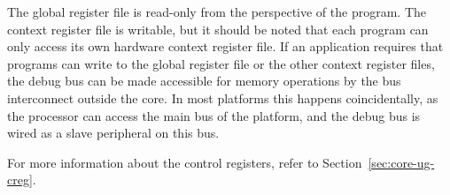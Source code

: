 The global register file is read-only from the perspective of the program. The 
context register file is writable, but it should be noted that each program can 
only access its own hardware context register file. If an application requires 
that programs can write to the global register file or the other context 
register files, the debug bus can be made accessible for memory operations by 
the bus interconnect outside the core. In most platforms this happens 
coincidentally, as the processor can access the main bus of the platform, and 
the debug bus is wired as a slave peripheral on this bus.
 
For more information about the control registers, refer to
Section~\ref{sec:core-ug-creg}.
